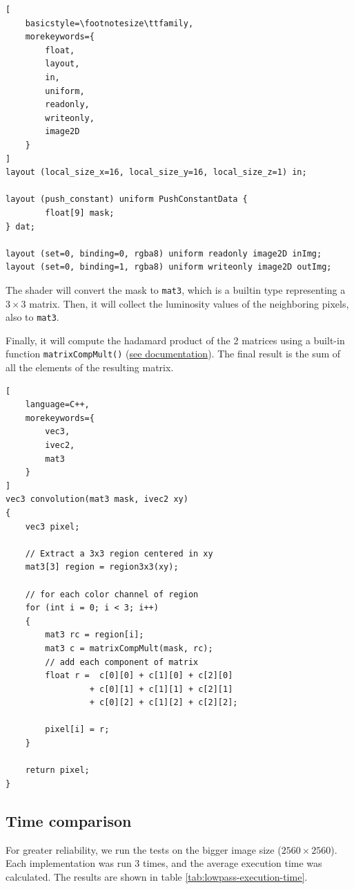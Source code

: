 \documentclass[12pt]{article}
\begin{document}
\begin{lstlisting}[
    basicstyle=\footnotesize\ttfamily,
    morekeywords={
        float,
        layout,
        in,
        uniform,
        readonly,
        writeonly,
        image2D
    }
]
layout (local_size_x=16, local_size_y=16, local_size_z=1) in;

layout (push_constant) uniform PushConstantData {
        float[9] mask;
} dat;

layout (set=0, binding=0, rgba8) uniform readonly image2D inImg;
layout (set=0, binding=1, rgba8) uniform writeonly image2D outImg;
\end{lstlisting}

The shader will convert the mask to \lstinline{mat3}, which is a builtin type representing a $3\times3$ matrix.
Then, it will collect the luminosity values of the neighboring pixels, also to \lstinline{mat3}.

Finally, it will compute the hadamard product of the 2 matrices using a built-in function \lstinline{matrixCompMult()} (\href{https://registry.khronos.org/OpenGL-Refpages/gl4/html/matrixCompMult.xhtml}{see documentation}).
The final result is the sum of all the elements of the resulting matrix.

\begin{lstlisting}[
    language=C++,
    morekeywords={
        vec3,
        ivec2,
        mat3
    }
]
vec3 convolution(mat3 mask, ivec2 xy)
{
    vec3 pixel;

    // Extract a 3x3 region centered in xy
    mat3[3] region = region3x3(xy);

    // for each color channel of region
    for (int i = 0; i < 3; i++)
    {
        mat3 rc = region[i];
        mat3 c = matrixCompMult(mask, rc);
        // add each component of matrix
        float r =  c[0][0] + c[1][0] + c[2][0]
                 + c[0][1] + c[1][1] + c[2][1]
                 + c[0][2] + c[1][2] + c[2][2];

        pixel[i] = r;
    }

    return pixel;
}
\end{lstlisting}

\subsection{Time comparison}

For greater reliability, we run the tests on the bigger image size ($2560 \times 2560$).
Each implementation was run 3 times, and the average execution time was calculated. The results are shown in table \ref{tab:lowpass-execution-time}.
\end{document}
